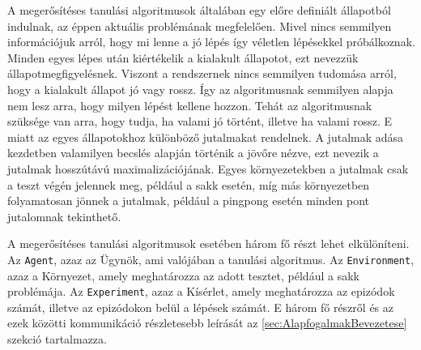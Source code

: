 A megerősítéses tanulási algoritmusok általában egy előre definiált állapotból indulnak, az éppen aktuális problémának megfelelően. Mivel nincs semmilyen információjuk arról, hogy mi lenne a jó lépés így véletlen lépésekkel próbálkoznak. Minden egyes lépes után kiértékelik a kialakult állapotot, ezt nevezzük állapotmegfigyelésnek. Viszont a rendszernek nincs semmilyen tudomása arról, hogy a kialakult állapot jó vagy rossz. Így az algoritmusnak semmilyen alapja nem lesz arra, hogy milyen lépést kellene hozzon. Tehát az algoritmusnak szüksége van arra, hogy tudja, ha valami jó történt, illetve ha valami rossz. E miatt az egyes állapotokhoz különböző jutalmakat rendelnek. A jutalmak adása kezdetben valamilyen becslés alapján történik a jövőre nézve, ezt nevezik a jutalmak hosszútávú maximalizációjának. Egyes környezetekben a jutalmak csak a teszt végén jelennek meg, például a sakk esetén, míg más környezetben folyamatosan jönnek a jutalmak, például a pingpong esetén minden pont jutalomnak tekinthető.

A megerősítéses tanulási algoritmusok esetében három fő részt lehet elkülöníteni. Az \texttt{Agent}, azaz az Ügynök, ami valójában a tanulási algoritmus. Az \texttt{Environment}, azaz a Környezet, amely meghatározza az adott tesztet, például a sakk problémája. Az \texttt{Experiment}, azaz a Kísérlet, amely meghatározza az epizódok számát, illetve az epizódokon belül a lépések számát. E három fő részről és az ezek közötti kommunikáció részletesebb leírását az \ref{sec:AlapfogalmakBevezetese} szekció tartalmazza.

